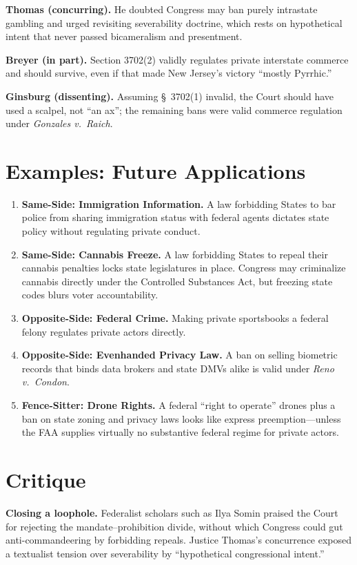 \documentclass[12pt]{article}
\begin{document}
\textbf{Thomas (concurring).} He doubted Congress may ban purely intrastate gambling and urged revisiting severability doctrine, which rests on hypothetical intent that never passed bicameralism and presentment.

\textbf{Breyer (in part).} Section 3702(2) validly regulates private interstate commerce and should survive, even if that made New Jersey's victory ``mostly Pyrrhic.''

\textbf{Ginsburg (dissenting).} Assuming \S~3702(1) invalid, the Court should have used a scalpel, not ``an ax''; the remaining bans were valid commerce regulation under \textit{Gonzales v.\ Raich}.

\section{Examples: Future Applications}

\begin{enumerate}
\item \textbf{Same-Side: Immigration Information.} A law forbidding States to bar police from sharing immigration status with federal agents dictates state policy without regulating private conduct.
\item \textbf{Same-Side: Cannabis Freeze.} A law forbidding States to repeal their cannabis penalties locks state legislatures in place. Congress may criminalize cannabis directly under the Controlled Substances Act, but freezing state codes blurs voter accountability.
\item \textbf{Opposite-Side: Federal Crime.} Making private sportsbooks a federal felony regulates private actors directly.
\item \textbf{Opposite-Side: Evenhanded Privacy Law.} A ban on selling biometric records that binds data brokers and state DMVs alike is valid under \textit{Reno v.\ Condon}.
\item \textbf{Fence-Sitter: Drone Rights.} A federal ``right to operate'' drones plus a ban on state zoning and privacy laws looks like express preemption---unless the FAA supplies virtually no substantive federal regime for private actors.
\end{enumerate}

\section{Critique}

\textbf{Closing a loophole.} Federalist scholars such as Ilya Somin praised the Court for rejecting the mandate--prohibition divide, without which Congress could gut anti-commandeering by forbidding repeals. Justice Thomas's concurrence exposed a textualist tension over severability by ``hypothetical congressional intent.''
\end{document}
